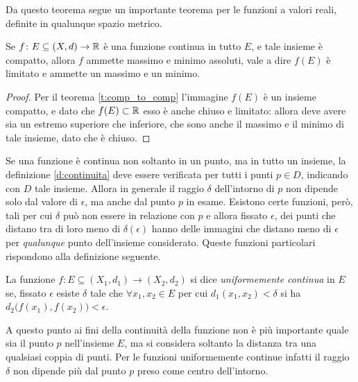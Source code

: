 Da questo teorema segue un importante teorema per le funzioni a valori reali, definite in qualunque spazio metrico.
\begin{teorema}[di Weierstrass]
\label{t:weierstrass}
Se $f\colon E\subseteq (X,d)\to\mathbb{R}$ è una funzione continua in tutto $E$, e tale insieme è compatto, allora $f$ ammette massimo e minimo assoluti, vale a dire $f(E)$ è limitato e ammette un massimo e un minimo.
\end{teorema}
\begin{proof}
Per il teorema \ref{t:comp_to_comp} l'immagine $f(E)$ è un insieme compatto, e dato che $f(E)\subset\mathbb{R}$ esso è anche chiuso e limitato: allora deve avere sia un estremo superiore che inferiore, che sono anche il massimo e il minimo di tale insieme, dato che è chiuso.
\end{proof}
Se una funzione è continua non soltanto in un punto, ma in tutto un insieme, la definizione \ref{d:continuita} deve essere verificata per tutti i punti $p\in D$, indicando con $D$ tale insieme. Allora in generale il raggio $\delta$ dell'intorno di $p$ non dipende solo dal valore di $\epsilon$, ma anche dal punto $p$ in esame. Esistono certe funzioni, però, tali per cui $\delta$ può non essere in relazione con $p$ e allora fissato $\epsilon$, dei punti che distano tra di loro meno di $\delta(\epsilon)$ hanno delle immagini che distano meno di $\epsilon$ per \emph{qualunque} punto dell'insieme considerato. Queste funzioni particolari rispondono alla definizione seguente.
\begin{definizione}
\label{d:continuita_uniforme}
La funzione $f\colon E\subseteq (X_1,d_1)\to(X_2,d_2)$ si dice \emph{uniformemente continua} in $E$ se, fissato $\epsilon$ esiste $\delta$ tale che $\forall x_1,x_2\in E$ per cui $d_1(x_1,x_2)<\delta$ si ha $d_2\big(f(x_1),f(x_2)\big)<\epsilon$.
\end{definizione}
A questo punto ai fini della continuità della funzione non è più importante quale sia il punto $p$ nell'insieme $E$, ma si considera soltanto la distanza tra una qualsiasi coppia di punti. Per le funzioni uniformemente continue infatti il raggio $\delta$ non dipende più dal punto $p$ preso come centro dell'intorno.

